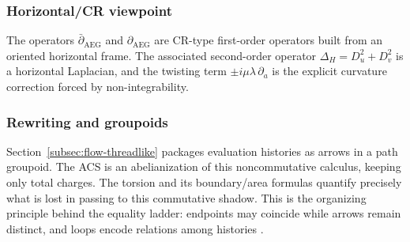 \subsubsection*{Horizontal/CR viewpoint}
The operators $\bar\partial_{\mathrm{AEG}}$ and $\partial_{\mathrm{AEG}}$ are CR-type first-order operators built from an oriented horizontal frame. The associated second-order operator $\Delta_H=D_u^2+D_v^2$ is a horizontal Laplacian, and the twisting term $\pm i\mu\lambda\,\partial_a$ is the explicit curvature correction forced by non-integrability.

\subsubsection*{Rewriting and groupoids}
Section~\ref{subsec:flow-threadlike} packages evaluation histories as arrows in a path groupoid. The ACS is an abelianization of this noncommutative calculus, keeping only total charges. The torsion and its boundary/area formulas quantify precisely what is lost in passing to this commutative shadow. This is the organizing principle behind the equality ladder: endpoints may coincide while arrows remain distinct, and loops encode relations among histories \cite{Post1943FormalRO,Chomsky1956ThreeMF}.
